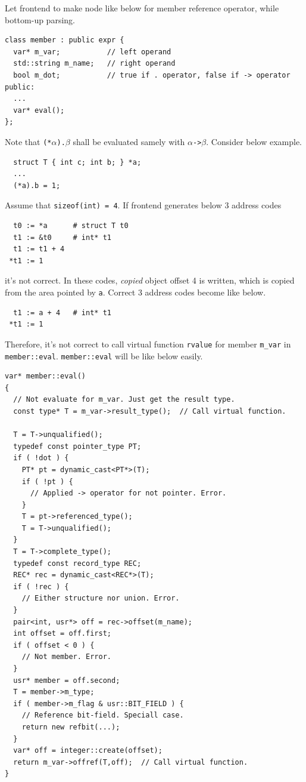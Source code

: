 Let frontend to make node like below for member reference operator,
while bottom-up parsing.
\begin{verbatim}
class member : public expr {
  var* m_var;           // left operand
  std::string m_name;   // right operand
  bool m_dot;           // true if . operator, false if -> operator
public:
  ...
  var* eval();
};
\end{verbatim}
Note that {\tt{(*$\alpha$).$\beta$}} shall be evaluated
samely with {\tt{$\alpha$->$\beta$}}.
Consider below example.
\begin{verbatim}
  struct T { int c; int b; } *a;
  ...
  (*a).b = 1;
\end{verbatim}
Assume that {\tt{sizeof(int) = 4}}. If frontend generates below
3 address codes
\begin{verbatim}
  t0 := *a      # struct T t0
  t1 := &t0     # int* t1
  t1 := t1 + 4
 *t1 := 1
\end{verbatim}
it's not correct. In these codes, {\em copied} object offset 4
is written, which is copied from the area pointed by {\tt{a}}.
Correct 3 address codes become like below.
\begin{verbatim}
  t1 := a + 4   # int* t1
 *t1 := 1
\end{verbatim}
Therefore, it's not correct to call virtual function {\tt{rvalue}}
for member {\tt{m\_var}} in {\tt{member::eval}}.
{\tt{member::eval}} will be like below easily.
\begin{verbatim}
var* member::eval()
{
  // Not evaluate for m_var. Just get the result type.
  const type* T = m_var->result_type();  // Call virtual function.

  T = T->unqualified();
  typedef const pointer_type PT;
  if ( !dot ) {
    PT* pt = dynamic_cast<PT*>(T);
    if ( !pt ) {
      // Applied -> operator for not pointer. Error.
    }
    T = pt->referenced_type();
    T = T->unqualified();
  }
  T = T->complete_type();
  typedef const record_type REC;
  REC* rec = dynamic_cast<REC*>(T);
  if ( !rec ) {
    // Either structure nor union. Error.
  }
  pair<int, usr*> off = rec->offset(m_name);
  int offset = off.first;
  if ( offset < 0 ) {
    // Not member. Error.
  }
  usr* member = off.second;
  T = member->m_type;
  if ( member->m_flag & usr::BIT_FIELD ) {
    // Reference bit-field. Speciall case.
    return new refbit(...);
  }
  var* off = integer::create(offset);
  return m_var->offref(T,off);  // Call virtual function.
}
\end{verbatim}

